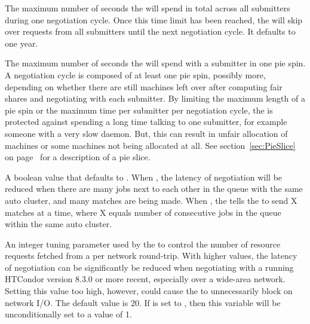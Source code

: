 \begin{description}
\label{param:NegotiatorMaxTimePerCycle}
\item[\Macro{NEGOTIATOR\_MAX\_TIME\_PER\_CYCLE}]
  The maximum number of seconds
  the  will spend in total across all submitters during one
  negotiation cycle.  Once this time limit has been reached, the
   will skip
  over requests from all submitters until the next negotiation cycle.
  It defaults to one year.

\label{param:NegotiatorMaxTimePerPieSpin}
\item[\Macro{NEGOTIATOR\_MAX\_TIME\_PER\_PIESPIN}]
  The maximum number of seconds the
   will spend with a submitter in one pie spin.
  A negotiation cycle is composed of at least one pie spin, possibly more,
  depending on whether there are still machines left over after
  computing fair shares and negotiating with each submitter.  By
  limiting the maximum length of a pie spin or the maximum time per
  submitter per negotiation cycle, the  is protected
  against spending a long time talking to one submitter, for example someone
  with a very slow  daemon.
  But, this can result in unfair allocation of
  machines or some machines not being allocated at all.
  See section~\ref{sec:PieSlice} on page~\pageref{sec:PieSlice}
  for a description of a pie slice.

\label{param:UseResourceRequestCounts}
\item[\Macro{USE\_RESOURCE\_REQUEST\_COUNTS}]
  A boolean value that defaults to . 
  When ,
  the latency of negotiation will be reduced 
  when there are many jobs next to each other in the queue
  with the same auto cluster, and many matches are being made.
  When ,
  the  tells the  
  to send X matches at a time,
  where X equals number of consecutive jobs in the queue 
  within the same auto cluster.

\label{param:NegotiatorResourceRequestListSize}
\item[\Macro{NEGOTIATOR\_RESOURCE\_REQUEST\_LIST\_SIZE}]
  An integer tuning parameter used by the  to control 
  the number of resource requests fetched from a  per 
  network round-trip.
  With higher values, 
  the latency of negotiation can be significantly be reduced
  when negotiating with a  running 
  HTCondor version 8.3.0 or more recent,
  especially over a wide-area network.
  Setting this value too high, however,
  could cause the  to unnecessarily block on network I/O.  
  The default value is 20.  If 
  is set to , then this variable will be unconditionally set
  to a value of 1.


\end{description}
